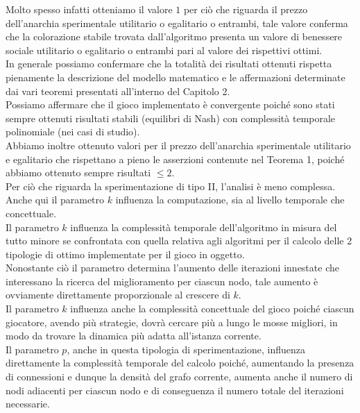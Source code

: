 Molto spesso infatti otteniamo il valore $1$ per ciò che riguarda il prezzo dell'anarchia sperimentale utilitario o egalitario o entrambi, tale valore conferma che la colorazione stabile trovata dall'algoritmo presenta un valore di benessere sociale utilitario o egalitario o entrambi pari al valore dei rispettivi ottimi.\\

In generale possiamo confermare che la totalità dei risultati ottenuti rispetta pienamente la descrizione del modello matematico e le affermazioni determinate dai vari teoremi presentati all'interno del Capitolo 2.\\
Possiamo affermare che il gioco implementato è convergente poiché sono stati sempre ottenuti risultati stabili (equilibri di Nash) con complessità temporale polinomiale (nei casi di studio).\\
Abbiamo inoltre ottenuto valori per il prezzo dell'anarchia sperimentale utilitario e egalitario che rispettano a pieno le asserzioni contenute nel Teorema 1, poiché abbiamo ottenuto sempre risultati \(\leq 2\).\\

Per ciò che riguarda la sperimentazione di tipo II, l'analisi è meno complessa.\\
Anche qui il parametro $k$ influenza la computazione, sia al livello temporale che concettuale.\\
Il parametro $k$ influenza la complessità temporale dell'algoritmo in misura del tutto minore se confrontata con quella relativa agli algoritmi per il calcolo delle 2 tipologie di ottimo implementate per il gioco in oggetto.\\
Nonostante ciò il parametro determina l'aumento delle iterazioni innestate che interessano la ricerca del miglioramento per ciascun nodo, tale aumento è ovviamente direttamente proporzionale al crescere di $k$.\\

Il parametro $k$ influenza anche la complessità concettuale del gioco poiché ciascun giocatore, avendo più strategie, dovrà cercare più a lungo le mosse migliori, in modo da trovare la dinamica più adatta all'istanza corrente.\\

Il parametro $p$, anche in questa tipologia di sperimentazione, influenza direttamente la complessità temporale del calcolo poiché, aumentando la presenza di connessioni e dunque la densità del grafo corrente, aumenta anche il numero di nodi adiacenti per ciascun nodo e di conseguenza il numero totale del iterazioni necessarie.\\

